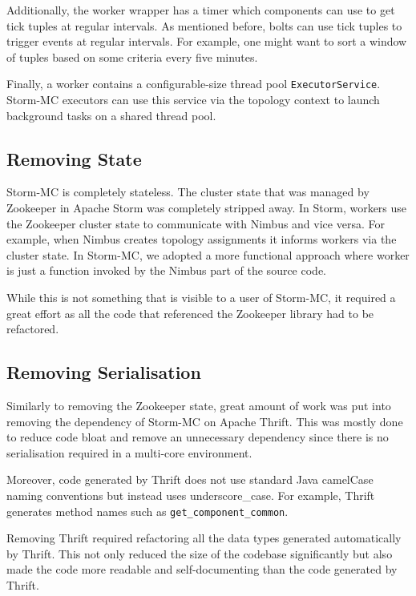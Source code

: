 \documentclass[bsc,logo,frontabs,twoside,singlespacing,normalheadings,parskip]{infthesis}\usepackage[]{graphicx}\usepackage[]{color}
\let\Oldtodo\todo
\renewcommand{\todo}[1]{\Oldtodo[inline]{#1}}
\begin{document}
Additionally, the worker wrapper has a timer which components can use to get tick tuples at regular intervals. As mentioned before, bolts can use tick tuples to trigger events at regular intervals. For example, one might want to sort a window of tuples based on some criteria every five minutes.

\todo{mention metrics here?}

Finally, a worker contains a configurable-size thread pool \texttt{ExecutorService}. Storm-MC executors can use this service via the topology context to launch background tasks on a shared thread pool.

\subsection{Removing State}

Storm-MC is completely stateless. The cluster state that was managed by Zookeeper in Apache Storm was completely stripped away. In Storm, workers use the Zookeeper cluster state to communicate with Nimbus and vice versa. For example, when Nimbus creates topology assignments it informs workers via the cluster state. In Storm-MC, we adopted a more functional approach where worker is just a function invoked by the Nimbus part of the source code.

While this is not something that is visible to a user of Storm-MC, it required a great effort as all the code that referenced the Zookeeper library had to be refactored.

\subsection{Removing Serialisation}

Similarly to removing the Zookeeper state, great amount of work was put into removing the dependency of Storm-MC on Apache Thrift. This was mostly done to reduce code bloat and remove an unnecessary dependency since there is no serialisation required in a multi-core environment.

Moreover, code generated by Thrift does not use standard Java camelCase naming conventions but instead uses underscore\_case. For example, Thrift generates method names such as \texttt{get\_component\_common}.

Removing Thrift required refactoring all the data types generated automatically by Thrift. This not only reduced the size of the codebase significantly but also made the code more readable and self-documenting than the code generated by Thrift.
\end{document}
